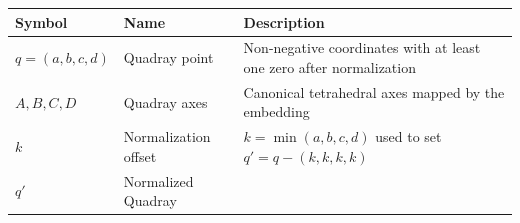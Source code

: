 \documentclass[
  10pt,
]{article}
\begin{document}
\begin{longtable}[]{@{}lll@{}}
\toprule
\begin{minipage}[b]{0.30\columnwidth}\raggedright
Symbol\strut
\end{minipage} & \begin{minipage}[b]{0.30\columnwidth}\raggedright
Name\strut
\end{minipage} & \begin{minipage}[b]{0.30\columnwidth}\raggedright
Description\strut
\end{minipage}\tabularnewline
\midrule
\endhead
\begin{minipage}[t]{0.30\columnwidth}\raggedright
\(q=(a,b,c,d)\)\strut
\end{minipage} & \begin{minipage}[t]{0.30\columnwidth}\raggedright
Quadray point\strut
\end{minipage} & \begin{minipage}[t]{0.30\columnwidth}\raggedright
Non-negative coordinates with at least one zero after
normalization\strut
\end{minipage}\tabularnewline
\begin{minipage}[t]{0.30\columnwidth}\raggedright
\(A,B,C,D\)\strut
\end{minipage} & \begin{minipage}[t]{0.30\columnwidth}\raggedright
Quadray axes\strut
\end{minipage} & \begin{minipage}[t]{0.30\columnwidth}\raggedright
Canonical tetrahedral axes mapped by the embedding\strut
\end{minipage}\tabularnewline
\begin{minipage}[t]{0.30\columnwidth}\raggedright
\(k\)\strut
\end{minipage} & \begin{minipage}[t]{0.30\columnwidth}\raggedright
Normalization offset\strut
\end{minipage} & \begin{minipage}[t]{0.30\columnwidth}\raggedright
\(k=\min(a,b,c,d)\) used to set \(q' = q - (k,k,k,k)\)\strut
\end{minipage}\tabularnewline
\begin{minipage}[t]{0.30\columnwidth}\raggedright
\(q'\)\strut
\end{minipage} & \begin{minipage}[t]{0.30\columnwidth}\raggedright
Normalized Quadray\strut
\end{minipage} & \begin{minipage}[t]{0.30\columnwidth}\raggedright

\end{minipage}
\end{longtable}
\end{document}
